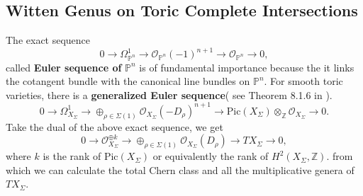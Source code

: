 \documentclass[11pt]{article}
\newcommand{\intg}{\mathbb Z}
\begin{document}
\subsection{Witten Genus on Toric Complete Intersections}
The exact sequence 
\begin{equation*}
0\longrightarrow \Omega_{\mathbb{P}^n}^{1}\longrightarrow\mathcal{O}_{\mathbb{P}^n}(-1)^{n+1}\longrightarrow \mathcal{O}_{\mathbb{P}^n} \longrightarrow0,
\end{equation*} called \textbf{Euler sequence of }$\mathbb{P}^n$ is of fundamental importance because the it links the cotangent bundle with the canonical line bundles on $\mathbb{P}^n$. For smooth toric varieties, there is a \textbf{generalized Euler sequence}( see Theorem 8.1.6 in \cite{cox2009toric}).
\begin{equation*}
0\longrightarrow \Omega_{X_\Sigma}^1\longrightarrow \oplus_{\rho\in \Sigma(1)}\mathcal{O}_{X_\Sigma}(-D_\rho)^{n+1}\longrightarrow \text{Pic}(X_\Sigma)\otimes_\intg \mathcal{O}_{X_\Sigma} \longrightarrow0.
\end{equation*}
Take the dual of the above exact sequence, we get 
\begin{equation*}
0\longrightarrow \mathcal{O}_{X_\Sigma}^{\oplus k}\longrightarrow\oplus_{\rho\in \Sigma(1)}\mathcal{O}_{X_\Sigma}(D_\rho)\longrightarrow TX_{\Sigma}\longrightarrow0,
\end{equation*}
where $k$ is the rank of $\text{Pic}(X_\Sigma)$ or equivalently the rank of $H^2(X_\Sigma,\mathbb{Z})$.
from which we can calculate the total Chern class and all the multiplicative genera of $TX_{\Sigma}$. 
\end{document}
